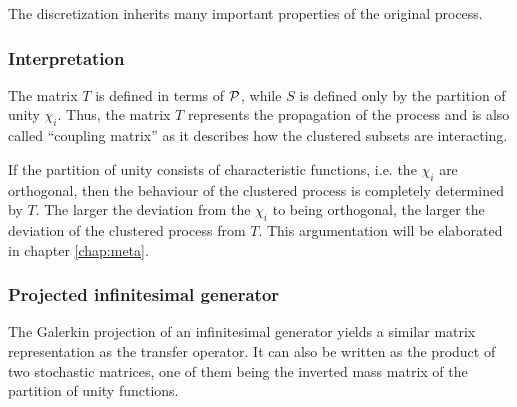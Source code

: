 The discretization inherits many important properties of the original process.

\subsubsection*{Interpretation}

The matrix $T$ is defined in terms of $\mathcal{P}$, while $S$ is defined only by the partition of unity $\chi_i$. Thus, the matrix $T$ represents the propagation of the process and is also called ``coupling matrix'' as it describes how the clustered subsets are interacting.

If the partition of unity consists of characteristic functions, i.e. the $\chi_i$ are orthogonal, then the behaviour of the clustered process is completely determined by $T$. The larger the deviation from the $\chi_i$ to being orthogonal, the larger the deviation of the clustered process from $T$.
This argumentation will be elaborated in chapter \ref{chap:meta}.

\subsubsection*{Projected infinitesimal generator}

The Galerkin projection of an infinitesimal generator yields a similar matrix representation as the transfer operator. It can also be written as the product of two stochastic matrices, one of them being the inverted mass matrix of the partition of unity functions.

